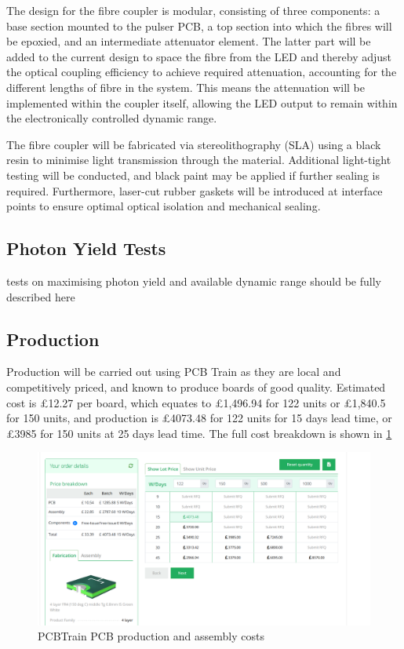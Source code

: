 \documentclass[a4paper,11pt]{article}
\begin{document}
The design for the fibre coupler is modular, consisting of three components: a base section mounted to the pulser PCB, a top section into which the fibres will be epoxied, and an intermediate attenuator element. The latter part will be added to the current design to space the fibre from the LED and thereby adjust the optical coupling efficiency to achieve required attenuation, accounting for the different lengths of fibre in the system. This means the attenuation will be implemented within the coupler itself, allowing the LED output to remain within the electronically controlled dynamic range.

The fibre coupler will be fabricated via stereolithography (SLA) using a black resin to minimise light transmission through the material. Additional light-tight testing will be conducted, and black paint may be applied if further sealing is required. Furthermore, laser-cut rubber gaskets will be introduced at interface points to ensure optimal optical isolation and mechanical sealing.

\subsection{Photon Yield Tests}
{\color{red} tests on maximising photon yield and available dynamic range should be fully described here}

\subsection{Production}

Production will be carried out using PCB Train as they are local and competitively priced, and known to produce boards of good quality. Estimated cost is £12.27 per board, which equates to £1,496.94 for 122 units or £1,840.5 for 150 units, and production is £4073.48 for 122 units for 15 days lead time, or £3985 for 150 units at 25 days lead time. The full cost breakdown is shown in \cref{fig:PCBTrainOrder}

\begin{figure}[htbp]
\centering
\includegraphics[scale=0.5]{PCBTrainOrder.png}
\caption{PCBTrain PCB production and assembly costs\label{fig:PCBTrainOrder}}
\end{figure}
\end{document}
